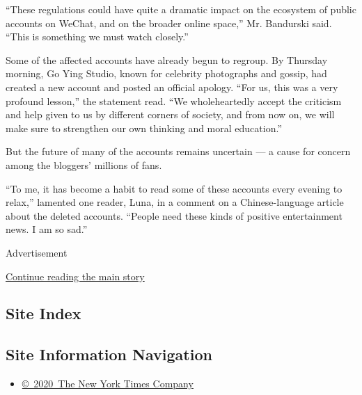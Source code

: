 ``These regulations could have quite a dramatic impact on the ecosystem
of public accounts on WeChat, and on the broader online space,'' Mr.
Bandurski said. ``This is something we must watch closely.''

Some of the affected accounts have already begun to regroup. By Thursday
morning, Go Ying Studio, known for celebrity photographs and gossip, had
created a new account and posted an official apology. ``For us, this was
a very profound lesson,'' the statement read. ``We wholeheartedly accept
the criticism and help given to us by different corners of society, and
from now on, we will make sure to strengthen our own thinking and moral
education.''

But the future of many of the accounts remains uncertain --- a cause for
concern among the bloggers' millions of fans.

``To me, it has become a habit to read some of these accounts every
evening to relax,'' lamented one reader, Luna, in a comment on a
Chinese-language article about the deleted accounts. ``People need these
kinds of positive entertainment news. I am so sad.''

Advertisement

\protect\hyperlink{after-bottom}{Continue reading the main story}

\hypertarget{site-index}{%
\subsection{Site Index}\label{site-index}}

\hypertarget{site-information-navigation}{%
\subsection{Site Information
Navigation}\label{site-information-navigation}}

\begin{itemize}
\tightlist
\item
  \href{https://help.nytimes.com/hc/en-us/articles/115014792127-Copyright-notice}{©~2020~The
  New York Times Company}
\end{itemize}

